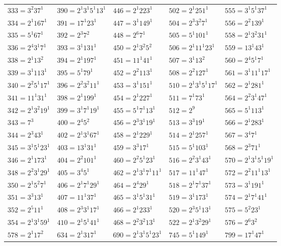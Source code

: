 {\begin{longtable}[c]{*{5}{l}}
$333=3^{2}37^{1}$&$390=2^{1}3^{1}5^{1}13^{1}$&$446=2^{1}223^{1}$&$502=2^{1}251^{1}$&$555=3^{1}5^{1}37^{1}$\\
$334=2^{1}167^{1}$&$391=17^{1}23^{1}$&$447=3^{1}149^{1}$&$504=2^{3}3^{2}7^{1}$&$556=2^{2}139^{1}$\\
$335=5^{1}67^{1}$&$392=2^{3}7^{2}$&$448=2^{6}7^{1}$&$505=5^{1}101^{1}$&$558=2^{1}3^{2}31^{1}$\\
$336=2^{4}3^{1}7^{1}$&$393=3^{1}131^{1}$&$450=2^{1}3^{2}5^{2}$&$506=2^{1}11^{1}23^{1}$&$559=13^{1}43^{1}$\\
$338=2^{1}13^{2}$&$394=2^{1}197^{1}$&$451=11^{1}41^{1}$&$507=3^{1}13^{2}$&$560=2^{4}5^{1}7^{1}$\\
$339=3^{1}113^{1}$&$395=5^{1}79^{1}$&$452=2^{2}113^{1}$&$508=2^{2}127^{1}$&$561=3^{1}11^{1}17^{1}$\\
$340=2^{2}5^{1}17^{1}$&$396=2^{2}3^{2}11^{1}$&$453=3^{1}151^{1}$&$510=2^{1}3^{1}5^{1}17^{1}$&$562=2^{1}281^{1}$\\
$341=11^{1}31^{1}$&$398=2^{1}199^{1}$&$454=2^{1}227^{1}$&$511=7^{1}73^{1}$&$564=2^{2}3^{1}47^{1}$\\
$342=2^{1}3^{2}19^{1}$&$399=3^{1}7^{1}19^{1}$&$455=5^{1}7^{1}13^{1}$&$512=2^{9}$&$565=5^{1}113^{1}$\\
$343=7^{3}$&$400=2^{4}5^{2}$&$456=2^{3}3^{1}19^{1}$&$513=3^{3}19^{1}$&$566=2^{1}283^{1}$\\
$344=2^{3}43^{1}$&$402=2^{1}3^{1}67^{1}$&$458=2^{1}229^{1}$&$514=2^{1}257^{1}$&$567=3^{4}7^{1}$\\
$345=3^{1}5^{1}23^{1}$&$403=13^{1}31^{1}$&$459=3^{3}17^{1}$&$515=5^{1}103^{1}$&$568=2^{3}71^{1}$\\
$346=2^{1}173^{1}$&$404=2^{2}101^{1}$&$460=2^{2}5^{1}23^{1}$&$516=2^{2}3^{1}43^{1}$&$570=2^{1}3^{1}5^{1}19^{1}$\\
$348=2^{2}3^{1}29^{1}$&$405=3^{4}5^{1}$&$462=2^{1}3^{1}7^{1}11^{1}$&$517=11^{1}47^{1}$&$572=2^{2}11^{1}13^{1}$\\
$350=2^{1}5^{2}7^{1}$&$406=2^{1}7^{1}29^{1}$&$464=2^{4}29^{1}$&$518=2^{1}7^{1}37^{1}$&$573=3^{1}191^{1}$\\
$351=3^{3}13^{1}$&$407=11^{1}37^{1}$&$465=3^{1}5^{1}31^{1}$&$519=3^{1}173^{1}$&$574=2^{1}7^{1}41^{1}$\\
$352=2^{5}11^{1}$&$408=2^{3}3^{1}17^{1}$&$466=2^{1}233^{1}$&$520=2^{3}5^{1}13^{1}$&$575=5^{2}23^{1}$\\
$354=2^{1}3^{1}59^{1}$&$410=2^{1}5^{1}41^{1}$&$468=2^{2}3^{2}13^{1}$&$522=2^{1}3^{2}29^{1}$&$576=2^{6}3^{2}$\\
\pagebreak
$578=2^{1}17^{2}$&$634=2^{1}317^{1}$&$690=2^{1}3^{1}5^{1}23^{1}$&$745=5^{1}149^{1}$&$799=17^{1}47^{1}$\\

\end{longtable}}
